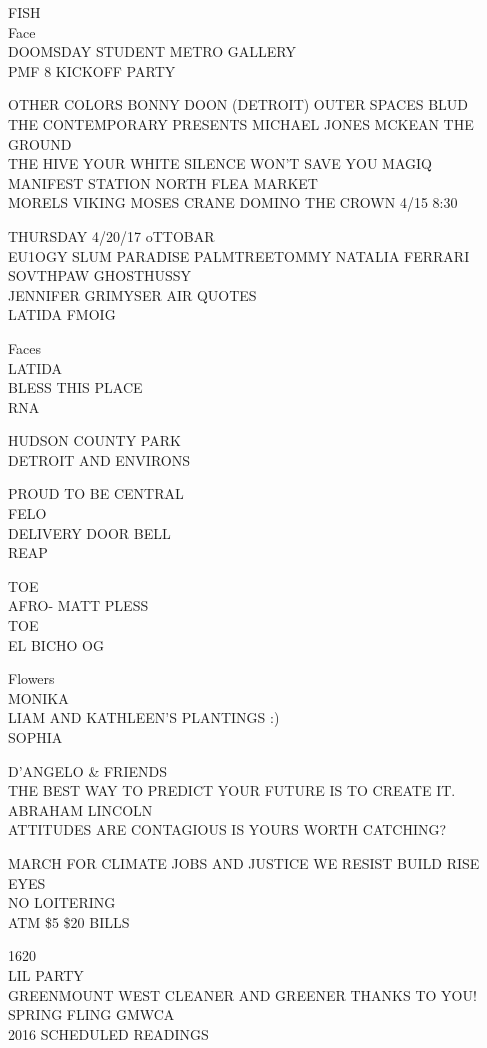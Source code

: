 \documentclass[10pt,letterpaper]{article}
\begin{document}
FISH\\
Face\\
DOOMSDAY STUDENT METRO GALLERY\\
PMF 8 KICKOFF PARTY

OTHER COLORS BONNY DOON (DETROIT) OUTER SPACES BLUD\\
THE CONTEMPORARY PRESENTS MICHAEL JONES MCKEAN THE GROUND\\
THE HIVE YOUR WHITE SILENCE WON'T SAVE YOU MAGIQ MANIFEST STATION NORTH FLEA MARKET\\
MORELS VIKING MOSES CRANE DOMINO THE CROWN 4/15 8:30

THURSDAY 4/20/17 oTTOBAR\\
EU1OGY SLUM PARADISE PALMTREETOMMY NATALIA FERRARI SOVTHPAW GHOSTHUSSY\\
JENNIFER GRIMYSER AIR QUOTES\\
LATIDA FMOIG

Faces\\
LATIDA\\
BLESS THIS PLACE\\
RNA

HUDSON COUNTY PARK\\
DETROIT AND ENVIRONS

PROUD TO BE CENTRAL\\
FELO\\
DELIVERY DOOR BELL\\
REAP

TOE\\
AFRO{-} MATT PLESS\\
TOE\\
EL BICHO OG

Flowers\\
MONIKA\\
LIAM AND KATHLEEN'S PLANTINGS :)\\
SOPHIA

D'ANGELO \& FRIENDS\\
THE BEST WAY TO PREDICT YOUR FUTURE IS TO CREATE IT. ABRAHAM LINCOLN\\
ATTITUDES ARE CONTAGIOUS IS YOURS WORTH CATCHING?

MARCH FOR CLIMATE JOBS AND JUSTICE WE RESIST BUILD RISE\\
EYES\\
NO LOITERING\\
ATM \$5 \$20 BILLS

1620\\
LIL PARTY\\
GREENMOUNT WEST CLEANER AND GREENER THANKS TO YOU!  SPRING FLING GMWCA\\
2016 SCHEDULED READINGS
\end{document}
